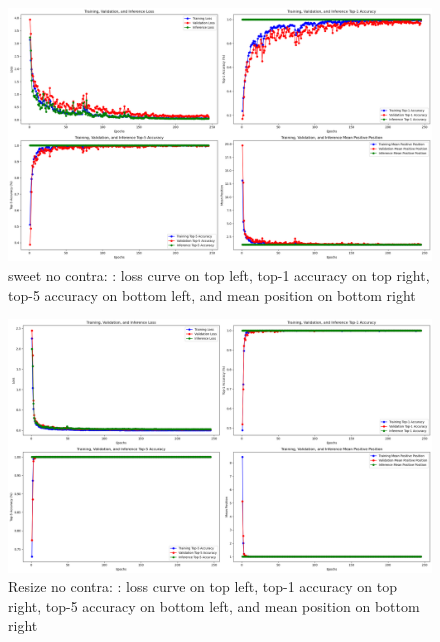 \begin{figure}[H]
  \centering
  \includegraphics[scale=0.3]{figures/sweet_no_contra.png} 
  \caption{sweet no contra: : loss curve on top left, top-1 accuracy on top right, top-5 accuracy on bottom left, and mean position on bottom right}
  \label{fig:sweet_no_contra}
\end{figure}

\vspace{-5mm} %

\begin{figure}[H]
  \centering
  \includegraphics[scale=0.3]{figures/Resize_No_contra.png} 
  \caption{Resize no contra: : loss curve on top left, top-1 accuracy on top right, top-5 accuracy on bottom left, and mean position on bottom right}
  \label{fig:Resize_No_contra_b64}
\end{figure}

\vspace{-5mm} %

